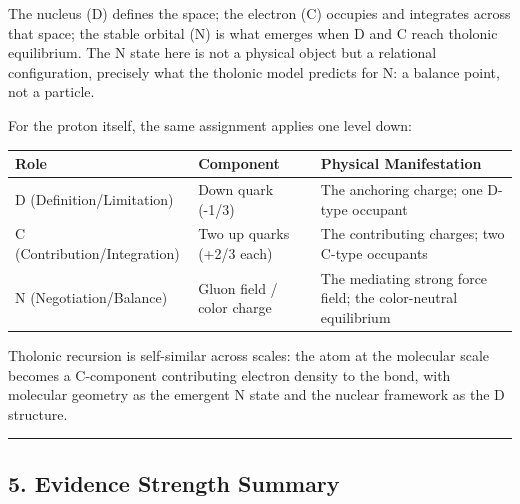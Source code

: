 \documentclass[
  11pt,
  letterpaper,
]{article}
\begin{document}
The nucleus (D) defines the space; the electron (C) occupies and
integrates across that space; the stable orbital (N) is what emerges
when D and C reach tholonic equilibrium. The N state here is not a
physical object but a relational configuration, precisely what the
tholonic model predicts for N: a balance point, not a particle.

For the proton itself, the same assignment applies one level down:

\begin{longtable}[]{@{}
  >{\raggedright\arraybackslash}p{}
  >{\raggedright\arraybackslash}p{}
  >{\raggedright\arraybackslash}p{}@{}}
\toprule\noalign{}
\begin{minipage}[b]{\linewidth}\raggedright
Role
\end{minipage} & \begin{minipage}[b]{\linewidth}\raggedright
Component
\end{minipage} & \begin{minipage}[b]{\linewidth}\raggedright
Physical Manifestation
\end{minipage} \\
\midrule\noalign{}
\endhead
\bottomrule\noalign{}
\endlastfoot
D (Definition/Limitation) & Down quark (-1/3) & The anchoring charge;
one D-type occupant \\
C (Contribution/Integration) & Two up quarks (+2/3 each) & The
contributing charges; two C-type occupants \\
N (Negotiation/Balance) & Gluon field / color charge & The mediating
strong force field; the color-neutral equilibrium \\
\end{longtable}

Tholonic recursion is self-similar across scales: the atom at the
molecular scale becomes a C-component contributing electron density to
the bond, with molecular geometry as the emergent N state and the
nuclear framework as the D structure.

\begin{center}\rule{0.5\linewidth}{0.5pt}\end{center}

\subsection{5. Evidence Strength
Summary}\label{evidence-strength-summary}
\end{document}
